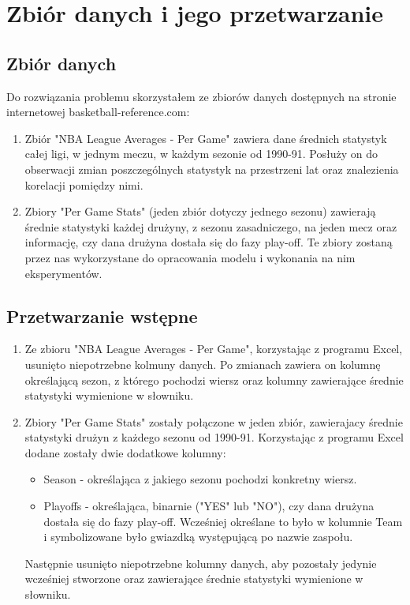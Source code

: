 \documentclass{article}
\begin{document}
\section{Zbiór danych i jego przetwarzanie}

\subsection{Zbiór danych}
    
Do rozwiązania problemu skorzystałem ze zbiorów danych dostępnych na stronie internetowej basketball-reference.com:
\begin{enumerate}
    \item Zbiór "NBA League Averages - Per Game" zawiera dane średnich statystyk całej ligi, w jednym meczu, w każdym sezonie od 1990-91. Posłuży on do obserwacji zmian poszczególnych statystyk na przestrzeni lat oraz znalezienia korelacji pomiędzy nimi.
    \item Zbiory "Per Game Stats" (jeden zbiór dotyczy jednego sezonu) zawierają średnie statystyki każdej drużyny, z sezonu zasadniczego, na jeden mecz oraz informację, czy dana drużyna dostała się do fazy play-off. Te zbiory zostaną przez nas wykorzystane do opracowania modelu i wykonania na nim eksperymentów.
\end{enumerate}


\subsection{Przetwarzanie wstępne}
\begin{enumerate}
    \item Ze zbioru "NBA League Averages - Per Game", korzystając z programu Excel, usunięto niepotrzebne kolmuny danych. Po zmianach zawiera on kolumnę określającą sezon, z którego pochodzi wiersz oraz kolumny zawierające średnie statystyki wymienione w słowniku.
    \item Zbiory "Per Game Stats" zostały połączone w jeden zbiór, zawierajacy średnie statystyki drużyn z każdego sezonu od 1990-91. Korzystając z programu Excel dodane zostały dwie dodatkowe kolumny:
    \begin{itemize}
        \item Season - określająca z jakiego sezonu pochodzi konkretny wiersz.
        \item Playoffs - określająca, binarnie  ("YES" lub "NO"), czy dana drużyna dostała się do fazy play-off. Wcześniej określane to było w kolumnie Team i symbolizowane było gwiazdką występującą po nazwie zaspołu.
    \end{itemize}
    Następnie usunięto niepotrzebne kolumny danych, aby pozostały jedynie wcześniej stworzone oraz zawierające średnie statystyki wymienione w słowniku.
\end{enumerate}
\end{document}
